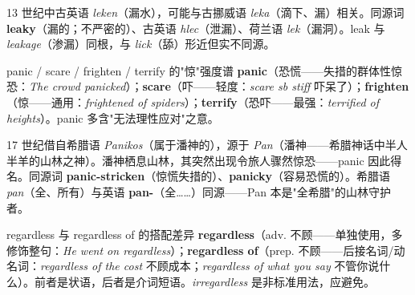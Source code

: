 \documentclass[../main.tex]{subfiles}
\begin{document}
\begin{origin}
13 世纪中古英语 \textit{leken}（漏水），可能与古挪威语 \textit{leka}（滴下、漏）相关。同源词 \textbf{leaky}（漏的；不严密的）、古英语 \textit{hlec}（泄漏）、荷兰语 \textit{lek}（漏洞）。leak 与 \textit{leakage}（渗漏）同根，与 \textit{lick}（舔）形近但实不同源。
\end{origin}




\begin{gram}{panic / scare / frighten / terrify 的"惊"强度谱}
\textbf{panic}（恐慌——失措的群体性惊恐：\textit{The crowd panicked}）；\textbf{scare}（吓——轻度：\textit{scare sb stiff} 吓呆了）；\textbf{frighten}（惊——通用：\textit{frightened of spiders}）；\textbf{terrify}（恐吓——最强：\textit{terrified of heights}）。panic 多含"无法理性应对"之意。
\end{gram}

\begin{origin}
17 世纪借自希腊语 \textit{Panikos}（属于潘神的），源于 \textit{Pan}（潘神——希腊神话中半人半羊的山林之神）。潘神栖息山林，其突然出现令旅人骤然惊恐——panic 因此得名。同源词 \textbf{panic-stricken}（惊慌失措的）、\textbf{panicky}（容易恐慌的）。希腊语 \textit{pan}（全、所有）与英语 \textbf{pan-}（全……）同源——Pan 本是"全希腊"的山林守护者。
\end{origin}



\begin{gram}{regardless 与 regardless of 的搭配差异}
\textbf{regardless}（adv. 不顾——单独使用，多修饰整句：\textit{He went on regardless}）；\textbf{regardless of}（prep. 不顾——后接名词/动名词：\textit{regardless of the cost} 不顾成本；\textit{regardless of what you say} 不管你说什么）。前者是状语，后者是介词短语。\textit{irregardless} 是非标准用法，应避免。
\end{gram}
\end{document}
